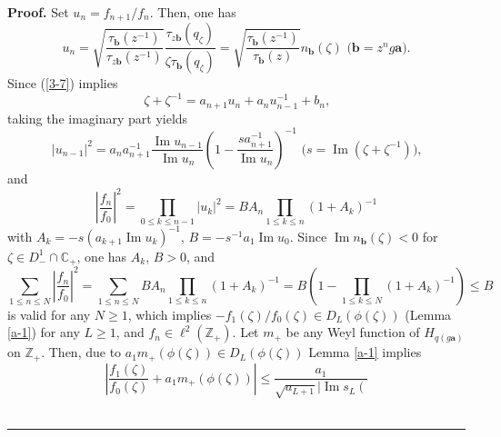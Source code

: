 \documentclass[a4paper]{article}%
\newenvironment{proof}[1][Proof]{\noindent\textbf{#1.} }{\ \rule{0.5em}{0.5em}}
\begin{document}
\begin{proof}
Set $u_{n}=f_{n+1}/f_{n}$. Then, one has%
\[
u_{n}=\sqrt{\dfrac{\tau_{\boldsymbol{b}}\left(  z^{-1}\right)  }%
{\tau_{z\boldsymbol{b}}\left(  z^{-1}\right)  }}\dfrac{\tau_{z\boldsymbol{b}%
}\left(  q_{\zeta}\right)  }{\zeta\tau_{\boldsymbol{b}}\left(  q_{\zeta
}\right)  }=\sqrt{\dfrac{\tau_{\boldsymbol{b}}\left(  z^{-1}\right)  }%
{\tau_{\boldsymbol{b}}\left(  z\right)  }}n_{\boldsymbol{b}}\left(
\zeta\right)  \text{ \ (}\boldsymbol{b}=z^{n}g\boldsymbol{a}\text{).}%
\]
Since (\ref{3-7}) implies%
\[
\zeta+\zeta^{-1}=a_{n+1}u_{n}+a_{n}u_{n-1}^{-1}+b_{n}\text{,}%
\]
taking the imaginary part yields%
\[
\left\vert u_{n-1}\right\vert ^{2}=a_{n}a_{n+1}^{-1}\dfrac{\operatorname{Im}%
u_{n-1}}{\operatorname{Im}u_{n}}\left(  1-\dfrac{sa_{n+1}^{-1}}%
{\operatorname{Im}u_{n}}\right)  ^{-1}\text{ \ \ (}s=\operatorname{Im}\left(
\zeta+\zeta^{-1}\right)  \text{),}%
\]
and%
\[
\left\vert \dfrac{f_{n}}{f_{0}}\right\vert ^{2}=%
{\displaystyle\prod_{0\leq k\leq n-1}}
\left\vert u_{k}\right\vert ^{2}=BA_{n}%
{\displaystyle\prod_{1\leq k\leq n}}
\left(  1+A_{k}\right)  ^{-1}%
\]
with $A_{k}=-s\left(  a_{k+1}\operatorname{Im}u_{k}\right)  ^{-1}$,
$B=-s^{-1}a_{1}\operatorname{Im}u_{0}$. Since $\operatorname{Im}%
n_{\boldsymbol{b}}\left(  \zeta\right)  <0$ for $\zeta\in D_{-}^{1}%
\cap\mathbb{C}_{+}$, one has $A_{k}$, $B>0$, and
\[
\sum_{1\leq n\leq N}\left\vert \dfrac{f_{n}}{f_{0}}\right\vert ^{2}%
=\sum_{1\leq n\leq N}BA_{n}%
{\displaystyle\prod_{1\leq k\leq n}}
\left(  1+A_{k}\right)  ^{-1}=B\left(  1-%
{\displaystyle\prod_{1\leq k\leq N}}
\left(  1+A_{k}\right)  ^{-1}\right)  \leq B
\]
is valid for any $N\geq1$, which implies $-f_{1}\left(  \zeta\right)
/f_{0}\left(  \zeta\right)  \in D_{L}\left(  \phi\left(  \zeta\right)
\right)  $ (Lemma \ref{a-1}) for any $L\geq1$, and $f_{n}\in\ell^{2}\left(
\mathbb{Z}_{+}\right)  $. Let $m_{+}$ be any Weyl function of $H_{q\left(
g\boldsymbol{a}\right)  }$ on $\mathbb{Z}_{+}$. Then, due to $a_{1}%
m_{+}\left(  \phi\left(  \zeta\right)  \right)  \in D_{L}\left(  \phi\left(
\zeta\right)  \right)  $ Lemma \ref{a-1} implies%
\begin{equation}
\left\vert \dfrac{f_{1}\left(  \zeta\right)  }{f_{0}\left(  \zeta\right)
}+a_{1}m_{+}\left(  \phi\left(  \zeta\right)  \right)  \right\vert \leq
\dfrac{a_{1}}{\sqrt{a_{L+1}}\left\vert \operatorname{Im}s_{L}\left(
}
\end{equation}
\end{proof}
\end{document}
